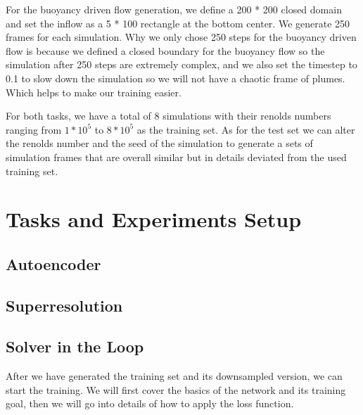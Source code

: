 \documentclass[a4paper,12pt,twoside]{report}
\begin{document}
For the buoyancy driven flow generation, we define a 200 * 200 closed domain and set the inflow as a 5 * 100 rectangle at the bottom center. We generate 250 frames for each simulation. Why we only chose 250 steps for the buoyancy driven flow is because we defined a closed boundary for the buoyancy flow so the simulation after 250 steps are extremely complex, and we also set the timestep to 0.1 to slow down the simulation so we will not have a chaotic frame of plumes. Which helps to make our training easier.

For both tasks, we have a total of 8 simulations with their renolds numbers ranging from $1*10^5$ to $8*10^5$ as the training set. As for the test set we can alter the renolds number and the seed of the simulation to generate a sets of simulation frames that are overall similar but in details deviated from the used training set. 








\chapter{Tasks and Experiments Setup}

\section{Autoencoder}

\section{Superresolution}

\section{Solver in the Loop}
After we have generated the training set and its downsampled version, we can start the training. We will first cover the basics of the network and its training goal, then we will go into details of how to apply the loss function.
\end{document}
